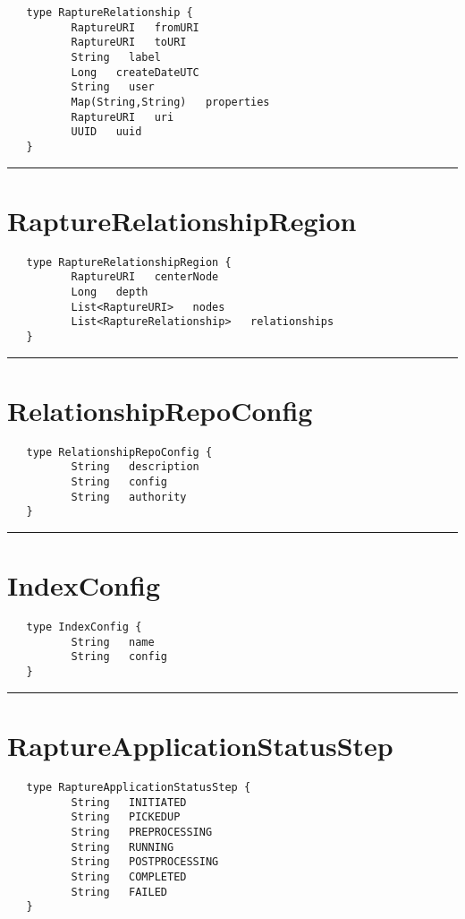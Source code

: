 \begin{verbatim}
   type RaptureRelationship {
          RaptureURI   fromURI
          RaptureURI   toURI
          String   label
          Long   createDateUTC
          String   user
          Map(String,String)   properties
          RaptureURI   uri
          UUID   uuid
   }
\end{verbatim}

\rule{15cm}{2pt}
\section{RaptureRelationshipRegion}
\label{type:RaptureRelationshipRegion}

\begin{verbatim}
   type RaptureRelationshipRegion {
          RaptureURI   centerNode
          Long   depth
          List<RaptureURI>   nodes
          List<RaptureRelationship>   relationships
   }
\end{verbatim}

\rule{15cm}{2pt}
\section{RelationshipRepoConfig}
\label{type:RelationshipRepoConfig}

\begin{verbatim}
   type RelationshipRepoConfig {
          String   description
          String   config
          String   authority
   }
\end{verbatim}

\rule{15cm}{2pt}
\section{IndexConfig}
\label{type:IndexConfig}

\begin{verbatim}
   type IndexConfig {
          String   name
          String   config
   }
\end{verbatim}

\rule{15cm}{2pt}
\section{RaptureApplicationStatusStep}
\label{type:RaptureApplicationStatusStep}

\begin{verbatim}
   type RaptureApplicationStatusStep {
          String   INITIATED
          String   PICKEDUP
          String   PREPROCESSING
          String   RUNNING
          String   POSTPROCESSING
          String   COMPLETED
          String   FAILED
   }
\end{verbatim}

